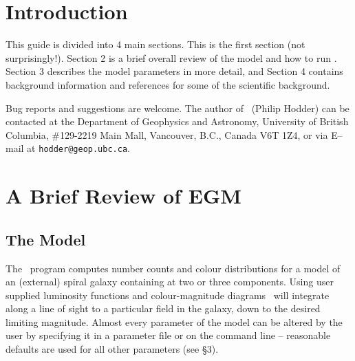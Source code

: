 
\newpage
\setcounter{page}{1}
\section{Introduction}

This guide is divided into 4 main sections.  This is the first section (not
surprisingly!). Section 2 is a brief overall review of the model and how
to run \egm. Section 3 describes the model parameters in more detail, and
Section 4 contains background information and references for some of the
scientific background. 

Bug reports and suggestions are welcome. The author of \egm\ (Philip Hodder)
can be contacted at the Department of Geophysics and Astronomy, University of
British Columbia, \#129-2219 Main Mall, Vancouver, B.C., Canada V6T 1Z4, or
via E--mail at {\tt hodder@geop.ubc.ca}.


\section{A Brief Review of EGM}
 
\subsection{The Model}

The \egm\ program computes number counts and colour distributions for a
model of an (external) spiral galaxy containing at two or three components.
Using user supplied luminosity functions and colour-magnitude diagrams \egm\ 
will integrate along a line of sight to a particular field in the galaxy,
down to the desired limiting magnitude.  Almost every parameter 
of the model can be altered by the user by specifying it in a parameter file
or on the command line -- reasonable defaults are used for all other
parameters (see \S 3).

